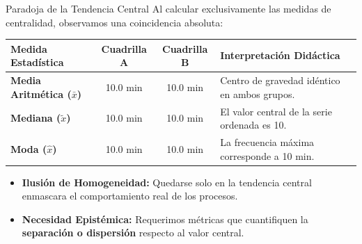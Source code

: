 \documentclass[
	spanish,
	aspectratio=169,
	xcolor={dvipsnames,table}
]{beamer}
\begin{document}
\begin{frame}{Paradoja de la Tendencia Central}
\small
Al calcular exclusivamente las medidas de centralidad, observamos una coincidencia absoluta:
\vspace{0.2cm}
\renewcommand{\arraystretch}{1.2}
\begin{tabularx}{\linewidth}{X|c|c|>{\raggedright\arraybackslash}X}
\toprule
\rowcolor{iiiepePale} \textbf{Medida Estadística} & \textbf{Cuadrilla A} & \textbf{Cuadrilla B} & \textbf{Interpretación Didáctica} \\
\midrule
\textbf{Media Aritmética ($\bar{x}$)} & 10.0 min & 10.0 min & Centro de gravedad idéntico en ambos grupos. \\
\textbf{Mediana ($\tilde{x}$)} & 10.0 min & 10.0 min & El valor central de la serie ordenada es 10. \\
\textbf{Moda ($\hat{x}$)} & 10.0 min & 10.0 min & La frecuencia máxima corresponde a 10 min. \\
\bottomrule
\end{tabularx}
\vspace{0.3cm}
\begin{itemize}\setlength{\itemsep}{0.15cm}
	\item \textbf{Ilusión de Homogeneidad:} Quedarse solo en la tendencia central enmascara el comportamiento real de los procesos.
	\item \textbf{Necesidad Epistémica:} Requerimos métricas que cuantifiquen la \textbf{separación o dispersión} respecto al valor central.
\end{itemize}
\end{frame}
\end{document}
